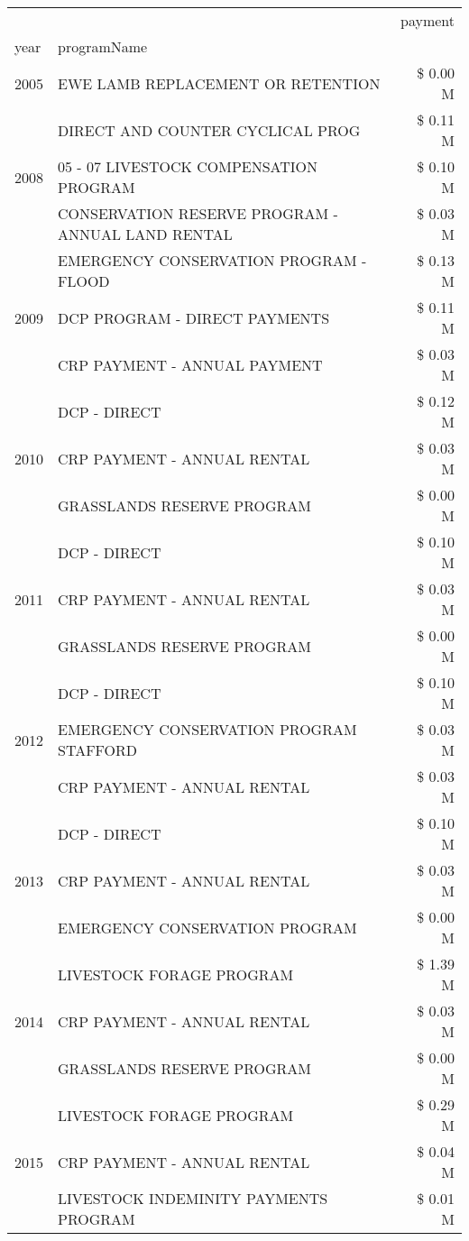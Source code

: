 \begin{tabular}{llr}
\toprule
 &  & payment \\
year & programName &  \\
\midrule
2005 & EWE LAMB REPLACEMENT OR RETENTION & \$ 0.00 M \\
\cline{1-3}
\multirow[t]{3}{*}{2008} & DIRECT AND COUNTER CYCLICAL PROG & \$ 0.11 M \\
 & 05 - 07 LIVESTOCK COMPENSATION PROGRAM & \$ 0.10 M \\
 & CONSERVATION RESERVE PROGRAM - ANNUAL LAND RENTAL & \$ 0.03 M \\
\cline{1-3}
\multirow[t]{3}{*}{2009} & EMERGENCY CONSERVATION PROGRAM - FLOOD & \$ 0.13 M \\
 & DCP PROGRAM - DIRECT PAYMENTS & \$ 0.11 M \\
 & CRP PAYMENT - ANNUAL PAYMENT & \$ 0.03 M \\
\cline{1-3}
\multirow[t]{3}{*}{2010} & DCP - DIRECT & \$ 0.12 M \\
 & CRP PAYMENT - ANNUAL RENTAL & \$ 0.03 M \\
 & GRASSLANDS RESERVE PROGRAM & \$ 0.00 M \\
\cline{1-3}
\multirow[t]{3}{*}{2011} & DCP - DIRECT & \$ 0.10 M \\
 & CRP PAYMENT - ANNUAL RENTAL & \$ 0.03 M \\
 & GRASSLANDS RESERVE PROGRAM & \$ 0.00 M \\
\cline{1-3}
\multirow[t]{3}{*}{2012} & DCP - DIRECT & \$ 0.10 M \\
 & EMERGENCY CONSERVATION PROGRAM STAFFORD & \$ 0.03 M \\
 & CRP PAYMENT - ANNUAL RENTAL & \$ 0.03 M \\
\cline{1-3}
\multirow[t]{3}{*}{2013} & DCP - DIRECT & \$ 0.10 M \\
 & CRP PAYMENT - ANNUAL RENTAL & \$ 0.03 M \\
 & EMERGENCY CONSERVATION PROGRAM & \$ 0.00 M \\
\cline{1-3}
\multirow[t]{3}{*}{2014} & LIVESTOCK FORAGE PROGRAM & \$ 1.39 M \\
 & CRP PAYMENT - ANNUAL RENTAL & \$ 0.03 M \\
 & GRASSLANDS RESERVE PROGRAM & \$ 0.00 M \\
\cline{1-3}
\multirow[t]{3}{*}{2015} & LIVESTOCK FORAGE PROGRAM & \$ 0.29 M \\
 & CRP PAYMENT - ANNUAL RENTAL & \$ 0.04 M \\
 & LIVESTOCK INDEMINITY PAYMENTS PROGRAM & \$ 0.01 M \\

\end{tabular}

